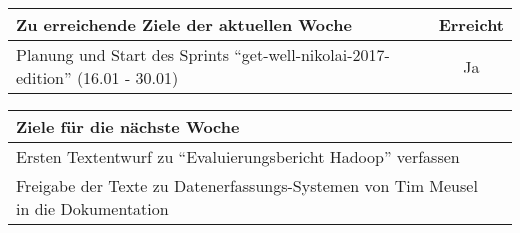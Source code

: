 \begin{tabularx}{\textwidth}{Xc}
    \arrayrulecolor{OliveGreen}
    \toprule
    {\bfseries Zu erreichende Ziele der aktuellen Woche} & {\bfseries Erreicht} \\
    \midrule[2pt]
    Planung und Start des Sprints ``get-well-nikolai-2017-edition''
    (16.01 - 30.01)  &  Ja  \\
    \bottomrule[2pt]
\end{tabularx}
%
\vspace{1cm}
%
\begin{tabularx}{\textwidth}{Xc}
    \arrayrulecolor{OliveGreen}
    \toprule
    {\bfseries Ziele für die nächste Woche}              &                      \\
    \midrule[2pt]
    Ersten Textentwurf zu ``Evaluierungsbericht Hadoop'' verfassen  &  \\
    \rowcolor{OliveGreen!15}
    Freigabe der Texte zu Datenerfassungs-Systemen von Tim Meusel in die
    Dokumentation  &  \\
\end{tabularx}
